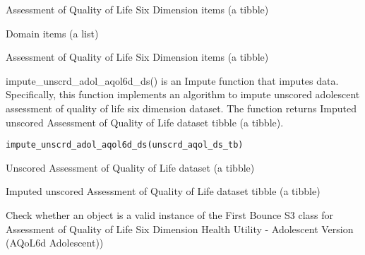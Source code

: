 \documentclass[a4paper]{book}
\begin{document}
%
\begin{Arguments}
\begin{ldescription}
\item[\code{aqol6d\_items\_tb}] Assessment of Quality of Life Six Dimension items (a tibble)

\item[\code{domain\_items\_ls}] Domain items (a list)
\end{ldescription}
\end{Arguments}
%
\begin{Value}
Assessment of Quality of Life Six Dimension items (a tibble)
\end{Value}
%
\begin{Description}\relax
impute\_unscrd\_adol\_aqol6d\_ds() is an Impute function that imputes data. Specifically, this function implements an algorithm to impute unscored adolescent assessment of quality of life six dimension dataset. The function returns Imputed unscored Assessment of Quality of Life dataset tibble (a tibble).
\end{Description}
%
\begin{Usage}
\begin{verbatim}
impute_unscrd_adol_aqol6d_ds(unscrd_aqol_ds_tb)
\end{verbatim}
\end{Usage}
%
\begin{Arguments}
\begin{ldescription}
\item[\code{unscrd\_aqol\_ds\_tb}] Unscored Assessment of Quality of Life dataset (a tibble)
\end{ldescription}
\end{Arguments}
%
\begin{Value}
Imputed unscored Assessment of Quality of Life dataset tibble (a tibble)
\end{Value}
%
\begin{Description}\relax
Check whether an object is a valid instance of the First Bounce S3 class for Assessment of Quality of Life Six Dimension Health Utility - Adolescent Version (AQoL6d Adolescent))
\end{Description}
\end{document}
